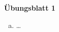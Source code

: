 \documentclass[12pt,halfparskip,oneside,a4paper]{scrartcl}
\date{\datum}
\title{\titel}
\renewcommand{\titel}{Übungsblatt 1}
\begin{document}
\begin{center}
	\LARGE{\textsf{\textbf{\titel}}}	
\end{center}


\begin{enumerate}[a)]
	\item \ldots
\end{enumerate}
\end{document}
